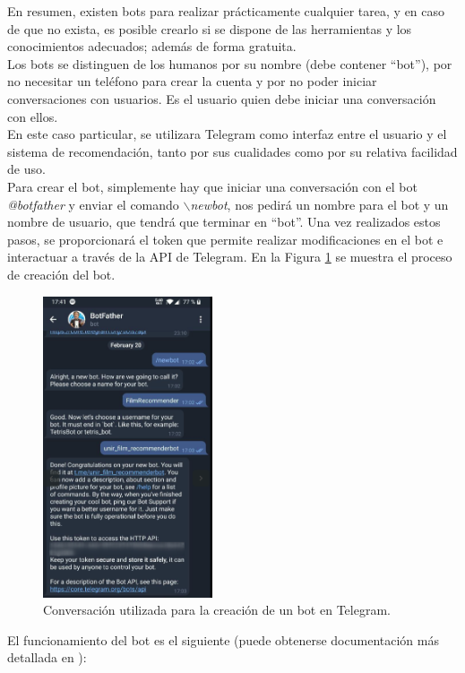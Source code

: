En resumen, existen bots para realizar prácticamente cualquier tarea, y en caso de que no exista, es posible crearlo si se dispone de las herramientas y los conocimientos adecuados; además de forma gratuita.\\

Los bots se distinguen de los humanos por su nombre (debe contener ``bot''), por no necesitar un teléfono para crear la cuenta y por no poder iniciar conversaciones con usuarios. Es el usuario quien debe iniciar una conversación con ellos.\\

En este caso particular, se utilizara Telegram como interfaz entre el usuario y el sistema de recomendación, tanto por sus cualidades como por su relativa facilidad de uso.\\

Para crear el bot, simplemente hay que iniciar una conversación con el bot \textit{@botfather} y enviar el comando \textit{$\backslash$newbot}, nos pedirá un nombre para el bot y un nombre de usuario, que tendrá que terminar en ``bot''. Una vez realizados estos pasos, se proporcionará el token que permite realizar modificaciones en el bot e interactuar a través de la API de Telegram. En la Figura \ref{fig:botfather} se muestra el proceso de creación del bot.

\begin{figure}[H]
    \centering
    \captionsetup{width=8cm}
    \includegraphics[width=5cm]{contenido/imagenes/botfather.png}
    \caption{Conversación utilizada para la creación de un bot en Telegram.}
    \label{fig:botfather}
\end{figure}


El funcionamiento del bot es el siguiente (puede obtenerse documentación más detallada en \cite{Telegram}):

